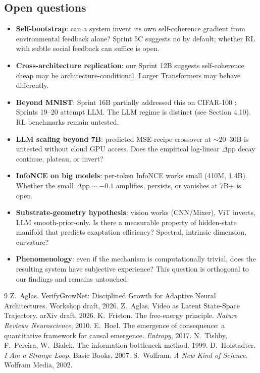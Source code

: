 \documentclass[11pt]{article}
\begin{document}
\subsection{Open questions}

\begin{itemize}
    \item \textbf{Self-bootstrap}: can a system invent its own self-coherence gradient from environmental feedback alone? Sprint 5C suggests no by default; whether RL with subtle social feedback can suffice is open.
    \item \textbf{Cross-architecture replication}: our Sprint 12B suggests self-coherence cheap may be architecture-conditional. Larger Transformers may behave differently.
    \item \textbf{Beyond MNIST}: Sprint 16B partially addressed this on CIFAR-100 ; Sprints 19--20 attempt LLM. The LLM regime is distinct (see Section 4.10). RL benchmarks remain untested.
    \item \textbf{LLM scaling beyond 7B}: predicted MSE-recipe crossover at $\sim 20$--$30$B is untested without cloud GPU access. Does the empirical log-linear $\Delta\text{pp}$ decay continue, plateau, or invert?
    \item \textbf{InfoNCE on big models}: per-token InfoNCE works small (410M, 1.4B). Whether the small $\Delta\text{pp}\sim-0.1$ amplifies, persists, or vanishes at 7B+ is open.
    \item \textbf{Substrate-geometry hypothesis}: vision works (CNN/Mixer), ViT inverts, LLM smooth-prior-only. Is there a measurable property of hidden-state manifold that predicts exaptation efficiency? Spectral, intrinsic dimension, curvature?
    \item \textbf{Phenomenology}: even if the mechanism is computationally trivial, does the resulting system have subjective experience? This question is orthogonal to our findings and remains untouched.
\end{itemize}


\begin{thebibliography}{9}
 Z.~Aglas. VerifyGrowNet: Disciplined Growth for Adaptive Neural Architectures. Workshop draft, 2026.
 Z.~Aglas. Video as Latent State-Space Trajectory. arXiv draft, 2026.
 K.~Friston. The free-energy principle. \emph{Nature Reviews Neuroscience}, 2010.
 E.~Hoel. The emergence of consequence: a quantitative framework for causal emergence. \emph{Entropy}, 2017.
 N.~Tishby, F.~Pereira, W.~Bialek. The information bottleneck method. 1999.
 D.~Hofstadter. \emph{I Am a Strange Loop}. Basic Books, 2007.
 S.~Wolfram. \emph{A New Kind of Science}. Wolfram Media, 2002.
\end{thebibliography}
\end{document}
